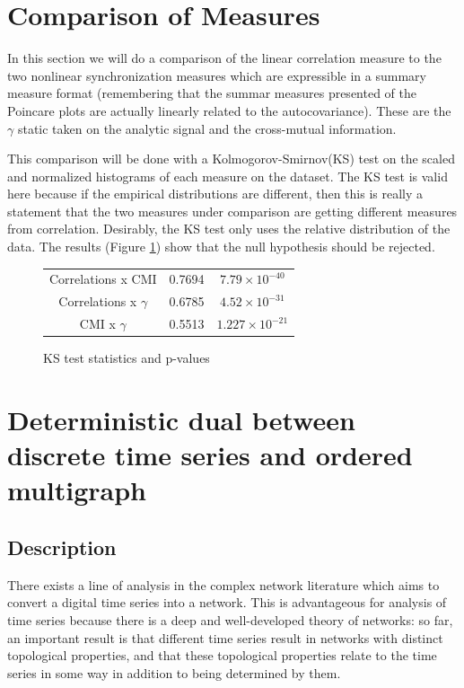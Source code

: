 \documentclass[12pt]{article}
\begin{document}
\section{Comparison of Measures}

In this section we will do a comparison of the linear correlation measure to the two nonlinear synchronization measures which are expressible in a summary measure format (remembering that the summar measures presented of the Poincare plots are actually linearly related to the autocovariance)\cite{kamen}. These are the $\gamma$ static taken on the analytic signal and the cross-mutual information.

This comparison will be done with a Kolmogorov-Smirnov(KS) test on the scaled and normalized histograms of each measure on the dataset. The KS test is valid here because if the empirical distributions are different, then this is really a statement that the two measures under comparison are getting different measures from correlation. Desirably, the KS test only uses the relative distribution of the data. The results (Figure \ref{table:ks_stats}) show that the null hypothesis should be rejected.

\begin{figure}
  \centering
  \begin{tabular}{c | c c}
    Correlations x CMI & 0.7694 & $7.79 \times 10^{-40}$\\
    Correlations x $\gamma$ & 0.6785 & $4.52 \times 10^{-31}$\\
    CMI x $\gamma$ & 0.5513 & $1.227 \times 10^{-21}$\\
  \end{tabular}
  \caption{KS test statistics and p-values}
  \label{table:ks_stats}
\end{figure}

\section{Deterministic dual between discrete time series and ordered multigraph}

\subsection{Description}

There exists a line of analysis in the complex network literature which aims to convert a digital time series into a network. This is advantageous for analysis of time series because there is a deep and well-developed theory of networks: so far, an important result is that different time series result in networks with distinct topological properties, and that these topological properties relate to the time series in some way in addition to being determined by them\cite{campanharo}.
\end{document}
